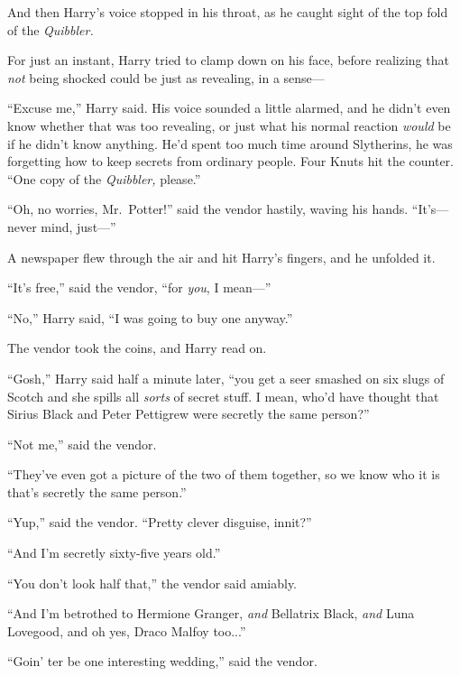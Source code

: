 And then Harry’s voice stopped in his throat, as he caught sight of the top fold of the \emph{Quibbler.}


For just an instant, Harry tried to clamp down on his face, before realizing that \emph{not} being shocked could be just as revealing, in a sense—

“Excuse me,” Harry said. His voice sounded a little alarmed, and he didn’t even know whether that was too revealing, or just what his normal reaction \emph{would} be if he didn’t know anything. He’d spent too much time around Slytherins, he was forgetting how to keep secrets from ordinary people. Four Knuts hit the counter. “One copy of the \emph{Quibbler,} please.”

“Oh, no worries, Mr.~Potter!” said the vendor hastily, waving his hands. “It’s—never mind, just—”

A newspaper flew through the air and hit Harry’s fingers, and he unfolded it.


“It’s free,” said the vendor, “for \emph{you}, I mean—”

“No,” Harry said, “I was going to buy one anyway.”

The vendor took the coins, and Harry read on.

“Gosh,” Harry said half a minute later, “you get a seer smashed on six slugs of Scotch and she spills all \emph{sorts} of secret stuff. I mean, who’d have thought that Sirius Black and Peter Pettigrew were secretly the same person?”

“Not me,” said the vendor.

“They’ve even got a picture of the two of them together, so we know who it is that’s secretly the same person.”

“Yup,” said the vendor. “Pretty clever disguise, innit?”

“And I’m secretly sixty-five years old.”

“You don’t look half that,” the vendor said amiably.

“And I’m betrothed to Hermione Granger, \emph{and} Bellatrix Black, \emph{and} Luna Lovegood, and oh yes, Draco Malfoy too...”

“Goin’ ter be one interesting wedding,” said the vendor.

